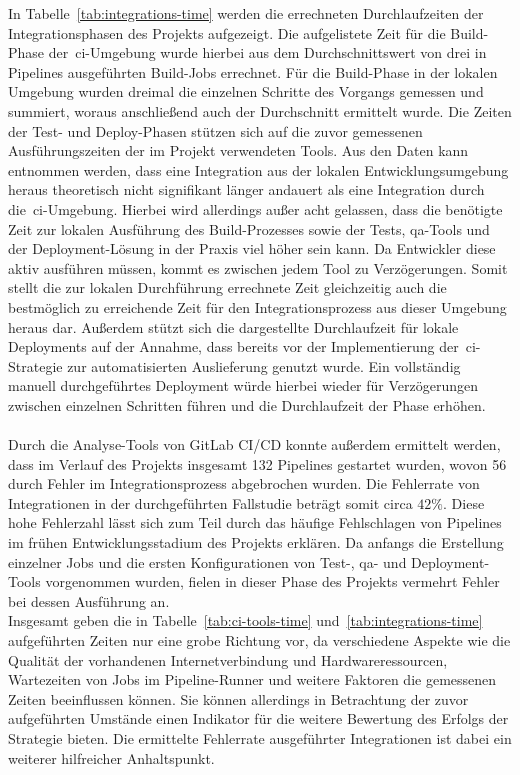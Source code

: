 In Tabelle\ \ref{tab:integrations-time} werden die errechneten Durchlaufzeiten der Integrationsphasen des Projekts
aufgezeigt.
Die aufgelistete Zeit für die Build-Phase der\ \acrshort{ci}-Umgebung wurde hierbei aus dem Durchschnittswert von drei
in Pipelines ausgeführten Build-Jobs errechnet.
Für die Build-Phase in der lokalen Umgebung wurden dreimal die einzelnen Schritte des Vorgangs gemessen und
summiert, woraus anschließend auch der Durchschnitt ermittelt wurde.
Die Zeiten der Test- und Deploy-Phasen stützen sich auf die zuvor gemessenen Ausführungszeiten der im Projekt
verwendeten Tools.
Aus den Daten kann entnommen werden, dass eine Integration aus der lokalen Entwicklungsumgebung heraus theoretisch
nicht signifikant länger andauert als eine Integration durch die\ \acrshort{ci}-Umgebung.
Hierbei wird allerdings außer acht gelassen, dass die benötigte Zeit zur lokalen Ausführung des Build-Prozesses sowie
der Tests, \acrshort{qa}-Tools und der Deployment-Lösung in der Praxis viel höher sein kann.
Da Entwickler diese aktiv ausführen müssen, kommt es zwischen jedem Tool zu Verzögerungen.
Somit stellt die zur lokalen Durchführung errechnete Zeit gleichzeitig auch die bestmöglich zu erreichende Zeit für
den Integrationsprozess aus dieser Umgebung heraus dar.
Außerdem stützt sich die dargestellte Durchlaufzeit für lokale Deployments auf der Annahme, dass 
bereits vor der Implementierung der\ \acrshort{ci}-Strategie zur automatisierten Auslieferung genutzt wurde.
Ein vollständig manuell durchgeführtes Deployment würde hierbei wieder für Verzögerungen zwischen einzelnen Schritten
führen und die Durchlaufzeit der Phase erhöhen.
\\\\
Durch die Analyse-Tools von GitLab CI/CD konnte außerdem ermittelt werden, dass im Verlauf des Projekts insgesamt 132
Pipelines gestartet wurden, wovon 56 durch Fehler im Integrationsprozess abgebrochen wurden.
Die Fehlerrate von Integrationen in der durchgeführten Fallstudie beträgt somit circa $42\%$.
Diese hohe Fehlerzahl lässt sich zum Teil durch das häufige Fehlschlagen von Pipelines im frühen Entwicklungsstadium
des Projekts erklären.
Da anfangs die Erstellung einzelner Jobs und die ersten Konfigurationen von Test-, \acrshort{qa}- und
Deployment-Tools vorgenommen wurden, fielen in dieser Phase des Projekts vermehrt Fehler bei dessen Ausführung an.
\\
Insgesamt geben die in Tabelle\ \ref{tab:ci-tools-time} und\ \ref{tab:integrations-time} aufgeführten Zeiten
nur eine grobe Richtung vor, da verschiedene Aspekte wie die Qualität der vorhandenen Internetverbindung und
Hardwareressourcen, Wartezeiten von Jobs im Pipeline-Runner und weitere Faktoren die gemessenen Zeiten beeinflussen
können.
Sie können allerdings in Betrachtung der zuvor aufgeführten Umstände einen Indikator für die weitere Bewertung des
Erfolgs der Strategie bieten.
Die ermittelte Fehlerrate ausgeführter Integrationen ist dabei ein weiterer hilfreicher Anhaltspunkt.

